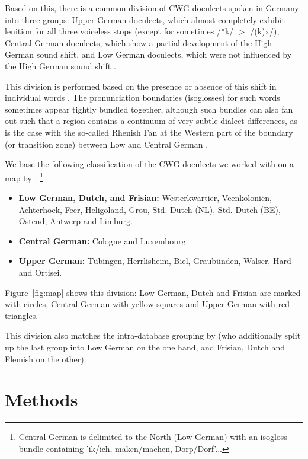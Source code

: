 \documentclass[a4paper]{article}
\begin{document}
Based on this, there is a common division
of CWG doculects spoken in Germany into three groups:
Upper German doculects, which almost completely
exhibit lenition for all three voiceless stops
(except for sometimes /*k/ $>$ /(k)x/),
Central German doculects, which show a
partial development of the High German sound shift,
and Low German doculects,
which were not influenced by the High German sound shift
\citep[pp. 33, 55]{noble1983modern}.

This division is performed based on
the presence or absence of this shift in individual words \citep[p. 63]{koenig2015dtv}.
The pronunciation boundaries (isoglosses) for such words
sometimes appear tightly bundled together,
although such bundles can also fan out such that a region
contains a continuum of very subtle dialect differences,
as is the case with the so-called Rhenish Fan at the Western part
of the boundary (or transition zone) between Low and Central German
\citep[pp. 63, 138, 141]{koenig2015dtv}.

We base the following classification of
the CWG doculects we worked with
on a map by \citet[pp. 230-231]{koenig2015dtv}:
\footnote{
Central German is delimited %
to the North (Low German) with an isogloss bundle containing
'ik/ich, maken/machen, Dorp/Dorf'...
}

\begin{itemize}
\item
\textbf{Low German, Dutch, and Frisian:}
Westerkwartier, Veenkoloni\"{e}n, Achterhoek,
Feer, Heligoland, Grou,
Std. Dutch (NL), Std. Dutch (BE), Ostend, Antwerp and Limburg.

\item
\textbf{Central German:}
Cologne and Luxembourg.

\item
\textbf{Upper German:}
T\"{u}bingen, Herrlisheim,
Biel, Graub\"{u}nden, Walser, Hard and Ortisei.
\end{itemize}

Figure~\ref{fig:map} shows this division:
Low German, Dutch and Frisian are marked with %
circles, Central German with yellow squares and Upper German with red triangles.

This division also matches the intra-database grouping by \citet{heggarty2018sound}
(who additionally split up the last group into
Low German on the one hand,
and Frisian, Dutch and Flemish on the other).

\section{Methods}
\label{sec:methods}
\end{document}
